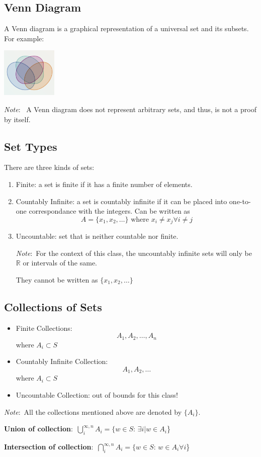\documentclass[nobib]{tufte-handout}
\newcommand{\defn}[2]{
        \begin{defbox}
        \noindent\textbf{#1}:\ #2
        \end{defbox}
}
\newcommand{\note}[1]{
        \begin{notebox}
        \noindent\textit{Note}:\ #1
        \end{notebox}
}
\begin{document}
\subsection{Venn Diagram}
A Venn diagram is a graphical representation of a universal set and its
subsets. For example:
\begin{center}
    \includegraphics*[width = 100px]{images/venn_example.png}
\end{center}

\note{ A Venn diagram does not represent arbitrary sets, and thus, is not a proof by itself.}

\subsection{Set Types}
There are three kinds of sets:
\begin{enumerate}
    \item Finite: a set is finite if it has a finite number of elements.
    \item Countably Infinite: a set is countably infinite if it can be placed into
          one-to-one correspondance with the integers. Can be written as \begin{equation*}
              A = \{x_1,x_2,\ldots\} \text{ where } x_i \neq x_j \forall i \neq j
          \end{equation*}
    \item Uncountable: set that is neither countable nor finite. \note{For the context of
              this class, the uncountably infinite sets will only be $\mathbb{R}$ or
              intervals of the same.} They cannot be written as $\{x_1,x_2,\ldots\}$
\end{enumerate}
\subsection{Collections of Sets}
\begin{itemize}
    \item Finite Collections:
          \begin{equation*}
              A_1, A_2, \ldots, A_n
          \end{equation*}
          where $A_i \subset S$
    \item Countably Infinite Collection:
          \begin{equation*}
              A_1, A_2, \ldots
          \end{equation*}
          where $A_i \subset S$
    \item Uncountable Collection: out of bounds for this class!
\end{itemize}
\note{All the collections mentioned above are denoted by $\{A_i\}$.}
\defn{Union of collection}{$\bigcup_i^{\infty,n} A_i = \{w \in S$: $\exists i | w \in A_i$\}}
\defn{Intersection of collection}{$\bigcap_i^{\infty,n} A_i = \{w \in S$: $w \in A_i \forall i$\}}
\end{document}
